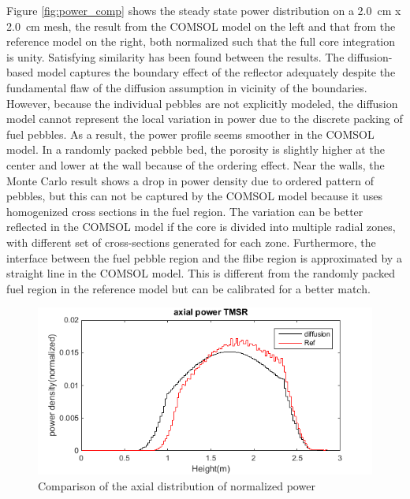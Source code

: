 \documentclass{elsarticle}
\begin{document}
Figure \ref{fig:power_comp} shows the steady state power distribution on a 2.0~cm x 2.0~cm mesh, the result from the COMSOL model on the left and that from the reference model on the right, both normalized such that the full core integration is unity. 
Satisfying similarity has been found between the results. The diffusion-based model captures the boundary effect of the reflector adequately despite the fundamental flaw of the diffusion assumption in vicinity of the boundaries. However, because the individual pebbles are not explicitly modeled, the diffusion model cannot represent the local variation in power due to the discrete packing of fuel pebbles. As a result, the power profile seems smoother in the COMSOL model. 
In a randomly packed pebble bed, the porosity is slightly higher at the center and lower at the wall because of the ordering effect. Near the walls, the Monte Carlo result shows a drop in power density due to ordered pattern of pebbles, but this can not be captured by the COMSOL model because it uses homogenized cross sections in the fuel region. The variation can be better reflected in the COMSOL model if the core is divided into multiple radial zones, with different set of cross-sections generated for each zone.
Furthermore, the interface between the fuel pebble region and the flibe region is approximated by a straight line in the COMSOL model. This is different from the randomly packed fuel region in the reference model but can be calibrated for a better match. 



\begin{figure}
  \centering
  \includegraphics[width=0.7\columnwidth]{./images/benchmark/axial_TMSR.png}
  \caption{Comparison of the axial distribution of normalized power}
  \label{fig:axial_power}
\end{figure}
\end{document}
